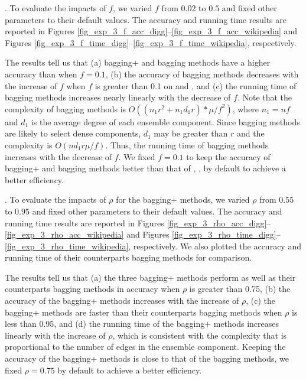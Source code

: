 . To evaluate the impacts of $f$, we
varied $f$ from $0.02$ to $0.5$ and fixed other parameters to their
default values. The accuracy and running time results are reported in
Figures \ref{fig_exp_3_f_acc_digg}--\ref{fig_exp_3_f_acc_wikipedia} and
Figures \ref{fig_exp_3_f_time_digg}--\ref{fig_exp_3_f_time_wikipedia}, respectively.



The results tell us that (a) bagging+ and bagging methods have a higher accuracy
than \NMF when $f = 0.1$, (b) the accuracy of bagging methods decreases
with the increase of $f$ when $f$ is greater than 0.1 on \Digg and \Wikipedia,
and (c) the running time of bagging methods increases
nearly linearly with the decrease of $f$. Note that the complexity of bagging methods is
$O((n_{1}r^2 + n_{1}d_{1}r)*\mu /f^2)$, where $n_1 = nf$ and $d_1$ is the average degree of
each ensemble component. Since bagging methods are likely to select dense components, $d_1$
may be greater than $r$ and the complexity is $O(nd_1r\mu /f)$. Thus, the running time
of bagging methods increases with the decrease of $f$. We fixed $f = 0.1$ to keep the accuracy of bagging+ and bagging
methods better than that of \NMF, , by default to achieve a better efficiency.




. To evaluate the impacts of $\rho$ for
the bagging+ methods, we varied $\rho$ from $0.55$ to $0.95$ and
fixed other parameters to their default values. The accuracy and
running time results are reported in
Figures \ref{fig_exp_3_rho_acc_digg}--\ref{fig_exp_3_rho_acc_wikipedia} and
Figures \ref{fig_exp_3_rho_time_digg}--\ref{fig_exp_3_rho_time_wikipedia}, respectively.
We also plotted the accuracy and running time of their counterparts
bagging methods for comparison.

The results tell us that (a) the three bagging+ methods perform
as well as their counterparts bagging methods in accuracy when
$\rho$ is greater than 0.75, (b) the accuracy of the bagging+ methods
increases with the increase of $\rho$, (c) the bagging+ methods are faster
than their counterparts bagging methods when $\rho$ is less than 0.95,
and (d) the running time of the bagging+ methods increases linearly
with the increase of $\rho$, which is consistent with
the complexity that is proportional to the number of edges in the
ensemble component. Keeping the accuracy of the bagging+ methods is close to
that of the bagging methods, we fixed $\rho = 0.75$ by default to achieve a better efficiency.



